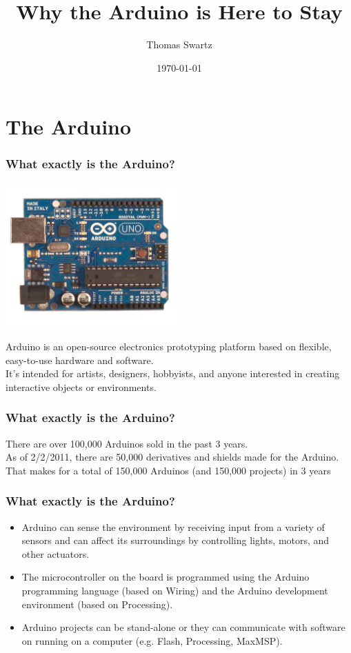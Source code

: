 \documentclass[yellow]{beamer}
\title{Why the Arduino is Here to Stay}
\author{Thomas Swartz}
\institute{The University of Scranton}
\date{\today}
\begin{document}
\frame{\titlepage}


\section{The Arduino}

\begin{frame}
\frametitle{What exactly is the Arduino?}
\begin{center}
	\includegraphics[width=0.50\textwidth]{arduinounofront.jpg}
\end{center}
Arduino is an open-source electronics prototyping platform based on flexible, easy-to-use hardware and software.\\ 
It's intended for artists, designers, hobbyists, and anyone interested in creating interactive objects or environments.
\end{frame}

\begin{frame}
\frametitle{What exactly is the Arduino?}
There are over 100,000 Arduinos sold \pause in the past 3 years.\\ 
\pause
As of 2/2/2011, there are 50,000 derivatives and shields made for the Arduino. \\
\pause
That makes for a total of 150,000 Arduinos (and 150,000 projects) in 3 years
\end{frame}

\begin{frame}
\frametitle{What exactly is the Arduino?}
\begin{itemize}
	\item<1-> Arduino can sense the environment by receiving input from a variety of sensors and can affect its surroundings by controlling lights, motors, and other actuators.
	\item<2-> The microcontroller on the board is programmed using the Arduino programming language (based on Wiring) and the Arduino development environment (based on Processing).
	\item<3-> Arduino projects can be stand-alone or they can communicate with software on running on a computer (e.g. Flash, Processing, MaxMSP).
\end{itemize}
\end{frame}
\end{document}
